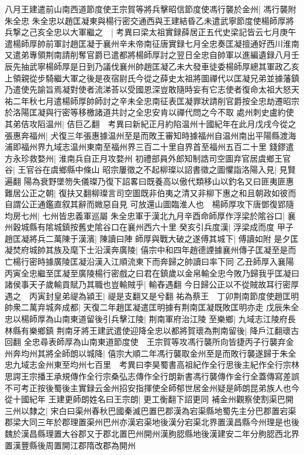 八月王建遣前山南西道節度使王宗賀等將兵擊昭信節度使馮行襲於金州|{
	馮行襲附朱全忠}
朱全忠以趙匡凝東與楊行密交通西與王建結昏乙未遣武寧節度使楊師厚將兵撃之己亥全忠以大軍繼之　|{
	考異曰梁太祖實録薛居正五代史梁記皆云七月庚午遣楊師厚帥前軍討趙匡凝于襄州辛未帝南征唐實録七月全忠奏匡凝擅通好西川淮南又遣弟專領荆南請削奪官爵已遣都將楊師厚討之翌日全忠自帥軍以進編遺録八月壬辰先抽武寧楊師厚是日到乃議伐襄州帥趙匡凝乙未大發車徒委楊師厚總其軍政乙亥上領親從步騎繼大軍之後是夜宿尉氏今從之薛史太祖將圖禪代以匡凝兄弟並據藩鎮乃遣使先諭旨焉凝對使者流涕荅以受國恩深豈敢隨時妄有它志使者復命太祖大怒天祐二年秋七月遣楊師厚帥師討之辛未全忠南征表匡凝罪狀請削官爵按全忠劫遷昭宗於洛陽匡凝與行密等移檄諸道共討之全忠安肯以禪代問之今不取}
處州刺史盧約使其弟佶攻䧟温州|{
	佶巨乙翻　考異曰新紀正月約陷温州十國紀年在此月戊戌今從之}
張惠奔福州|{
	犬復三年張惠據温州至是而敗王審知時據福州自温州南出平陽縣渡海浦即福州界九域志温州東南至福州界三百二十里自界首至福州五百二十里}
錢鏐遣方永珍救婺州|{
	淮南兵自正月攻婺州}
初禮部員外郎知制誥司空圖弃官居虞鄉王官谷|{
	王官谷在虞鄉縣中條山}
昭宗屢徵之不起柳璨以詔書徵之圖懼詣洛陽入見|{
	見賢遍翻}
陽為衰野墜笏失儀璨乃復下詔畧曰既養高以傲代類移山以釣名又曰匪夷匪惠難居公正之朝|{
	復扶又翻柳璨言司空圖既非伯夷之清又非柳下惠之和且朝政如彼而自謂公正通鑑直叙其辭而媺惡自見}
可放還山圖臨淮人也　楊師厚攻下唐鄧復郢隨均房七州|{
	七州皆忠義軍巡屬}
朱全忠軍于漢北九月辛酉命師厚作浮梁於隂谷口|{
	襄州穀城縣有隂城鎮按舊史隂谷口在襄州西六十里}
癸亥引兵度漢|{
	浮梁成而度}
甲子趙匡凝將兵二萬陳于漢濱|{
	陳讀曰陣}
師厚與戰大破之遂傅其城下|{
	傅讀如附}
是夕匡凝焚府城帥其族及麾下士沿漢奔廣陵|{
	僖宗中和四年趙德諲據襄州傳子匡凝至是而亡楊行密時據廣陵匡凝沿漢入江順流東下而奔歸之帥讀曰率下同}
乙丑師厚入襄陽丙寅全忠繼至匡凝至廣陵楊行密戲之曰君在鎮歲以金帛輸全忠今敗乃歸我乎匡凝曰諸侯事天子歲輸貢賦乃其職也豈輸賊乎|{
	輸舂遇翻}
今日歸公正以不從賊故耳行密厚遇之　丙寅封皇弟禔為潁王|{
	禔是支翻又是兮翻}
祐為蔡王　丁卯荆南節度使趙匡明帥衆二萬弃城奔成都|{
	天復二年趙匡凝遣匡明據有荆南匡凝既敗匡明亦走}
戊辰朱全忠以楊師厚為山南東道留後引兵擊江陵|{
	荆南軍府治江陵}
至樂鄉|{
	九域志江陵府長林縣有樂鄉鎮}
荆南牙將王建武遣使迎降全忠以都將賀瓌為荆南留後|{
	降戶江翻瓌古回翻}
全忠尋表師厚為山南東道節度使　王宗賀等攻馮行襲所向皆捷丙子行襲弃金州奔均州其將全師朗以城降|{
	僖宗大順二年馮行襲取金州至是而敗行襲遂歸于朱全忠九域志金州東至均州七百里　考異曰李昊蜀書高祖紀作全行思後主紀作全行宗林思諤王宗播王承規傳作全行宗桑弘志傳作全行朗新書馮行襲傳作金行全蓋傳寫差誤不可考正按後蜀後主實録云金州招安指揮使全師郁世居金州疑是師朗昆弟族人也今從十國紀年}
王建更師朗姓名曰王宗朗|{
	更工衡翻下詔更同}
補金州觀察使割渠巴開三州以隸之|{
	宋白曰渠州春秋巴國秦滅巴置巴郡漢為宕渠縣地蜀先主分巴郡置宕渠郡梁大同三年於郡理置渠州巴州亦漢宕渠地後漢分宕渠北界置漢昌縣今州理是也後魏於漢昌縣理置大谷郡又于郡北置巴州開州漢朐䏰縣地後漢建安二年分朐䏰西北界置漢豐縣後周置開江郡隋改郡為開州}
